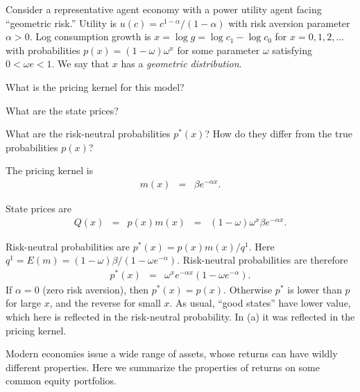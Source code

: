 \documentclass[11pt]{exam}
\begin{document}
\begin{questions}
Consider a representative agent economy with a power utility agent facing ``geometric risk.''
Utility is $u(c) = c^{1-\alpha}/(1-\alpha) $ with risk aversion
parameter $\alpha > 0$.
Log consumption growth is $ x = \log g = \log c_1 - \log c_0 $
for $ x = 0,1,2, \ldots$ with probabilities
$ p(x) = (1-\omega) \omega^x$ for some parameter $\omega$
satisfying $0< \omega e < 1$.
We say that $x$ has a {\it geometric distribution\/}.
%
\begin{parts}
\item What is the pricing kernel for this model?
\item What are the state prices?
\item What are the risk-neutral probabilities $p^*(x)$?
How do they differ from the true probabilities $p(x)$?
\end{parts}

\begin{solution}
\begin{parts}
\item The pricing kernel is
\begin{eqnarray*}
    m(x) &=& \beta e^{-\alpha x} .
\end{eqnarray*}
\item State prices are
\begin{eqnarray*}
    Q(x) &=& p(x) m(x) \;\;=\;\; (1-\omega) \omega^x \beta e^{-\alpha x} .
\end{eqnarray*}
\item Risk-neutral probabilities are $ p^*(x) = p(x) m(x) / q^1 $.
Here $q^1 = E(m) = (1-\omega) \beta /(1-\omega e^{-\alpha}) $.
Risk-neutral probabilities are therefore
\begin{eqnarray*}
    p^*(x) &=&  \omega^x  e^{-\alpha x}(1-\omega e^{-\alpha}) .
\end{eqnarray*}
If $\alpha = 0$ (zero risk aversion), then $p^*(x) = p(x)$.
Otherwise $p^*$ is lower than $p$ for large $x$,
and the reverse for small $x$.
As usual, ``good states'' have lower value, which here is reflected
in the risk-neutral probability.
In (a) it was reflected in the pricing kernel.
\end{parts}
\end{solution}



Modern economies issue a wide range of assets,
whose returns can have wildly different properties.
Here we summarize the properties of
returns on some common equity portfolios.


\end{questions}
\end{document}
